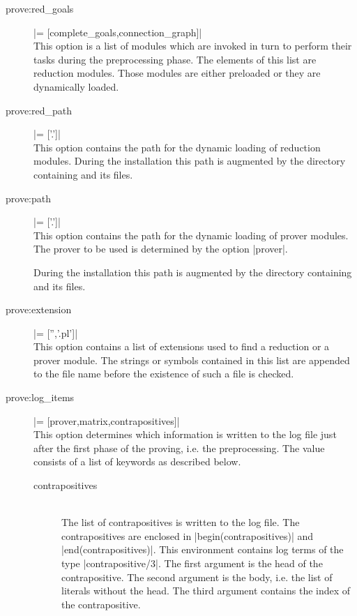 \begin{description}
\item [prove:red\_goals] |= [complete_goals,connection_graph]|\\
  This option is a list of modules which are invoked in turn to perform their
  tasks during the preprocessing phase. The elements of this list are
  reduction modules. Those modules are either preloaded or they are
  dynamically loaded.
  
\item [prove:red\_path] |= ['.']|\\
  This option contains the path for the dynamic loading of reduction
  modules. During the installation this path is augmented by the directory
  containing \ProTop{} and its files.

\item [prove:path] |= ['.']|\\
  This option contains the path for the dynamic loading of prover modules.
  The prover to be used is determined by the option |prover|.

  During the installation this path is augmented by the directory containing
  \ProTop{} and its files.

\item [prove:extension] |= ['','.pl']|\\
  This option contains a list of extensions used to find a reduction or a
  prover module. The strings or symbols contained in this list are appended to
  the file name before the existence of such a file is checked.

\item [prove:log\_items] |= [prover,matrix,contrapositives]|\\
  This option determines which information is written to the log file just
  after the first phase of the proving, i.e. the preprocessing. The value
  consists of a list of keywords as described below.

  \begin{description}
  \item[contrapositives]\ \\
    The list of contrapositives is written to the log file. The
    contrapositives are enclosed in |begin(contrapositives)| and
    |end(contrapositives)|. This environment contains log terms of the
    type |contrapositive/3|. The first argument is the head of the
    contrapositive. The second argument is the body, i.e. the list of literals
    without the head. The third argument contains the index of the
    contrapositive. 


\end{description}
\end{description}
